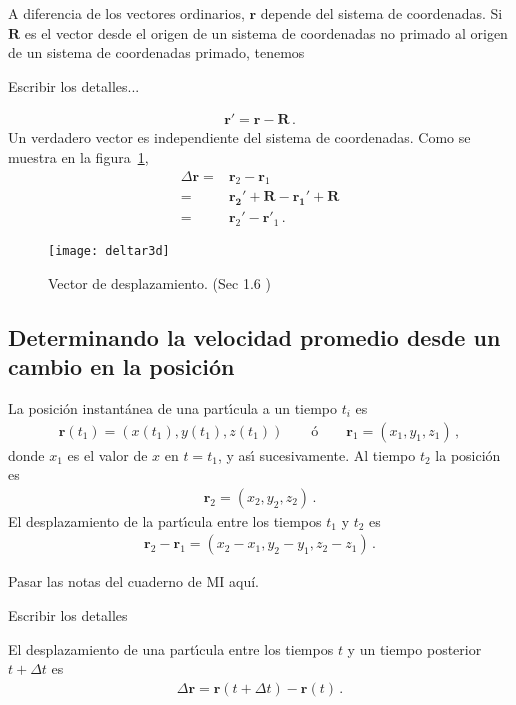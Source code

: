 A diferencia de los vectores ordinarios, $\mathbf{r}$ depende del sistema de coordenadas. Si $\mathbf{R}$ es el vector desde el origen de un sistema de coordenadas no primado al origen de un sistema de coordenadas primado, tenemos
\begin{inprogress}
  Escribir los detalles...
\end{inprogress}
\begin{align}
  \mathbf{r}'=\mathbf{r}-\mathbf{R}\,.
\end{align}
Un verdadero  vector es independiente del sistema de coordenadas. Como se muestra en la figura~\ref{fig:vpos},
\begin{align}
  \Delta\mathbf{r}=&\mathbf{r}_2-\mathbf{r}_1\nonumber\\
  =&\mathbf{\mathbf{r}_2'+\mathbf{R}}
-\mathbf{\mathbf{r}_1'+\mathbf{R}}\nonumber\\
=&\mathbf{r}_2'-\mathbf{r}'_1\,.
\end{align}
\begin{frame}[plain]
  \begin{figure}
  \centering
  \texttt{[image: deltar3d]}
  \caption{Vector de desplazamiento. (Sec 1.6 \cite{Kleppner})}
  \label{fig:vpos}
\end{figure}
\end{frame}

\subsection{Determinando la velocidad promedio desde un cambio en la posición}
La posici\'on instant\'anea de una part\'\i cula a un tiempo $t_i$ es
\begin{align}
  \mathbf{r}(t_1)=(x(t_1),y(t_1),z(t_1))\qquad \text{\'o}\qquad
  \mathbf{r}_1=(x_1,y_1,z_1)\,,
\end{align}
donde $x_1$ es el valor de $x$ en $t=t_1$, y as\'\i{} sucesivamente. Al tiempo $t_2$ la posici\'on es
\begin{align}
  \mathbf{r}_2=(x_2,y_2,z_2)\,.
\end{align}
El desplazamiento de la part\'\i cula entre los tiempos $t_1$ y $t_2$ es
\begin{align}
  \mathbf{r}_2-\mathbf{r}_1=(x_2-x_1,y_2-y_1,z_2-z_1)\,.
\end{align}



\begin{inprogress}
Pasar las notas del cuaderno de MI aquí.

Escribir los detalles %
\end{inprogress}
El desplazamiento de una part\'\i cula entre los tiempos $t$ y un tiempo posterior $t+\Delta t$ es
\begin{align}
  \Delta\mathbf{r}=\mathbf{r}(t+\Delta t)-\mathbf{r}(t)\,.
\end{align}


